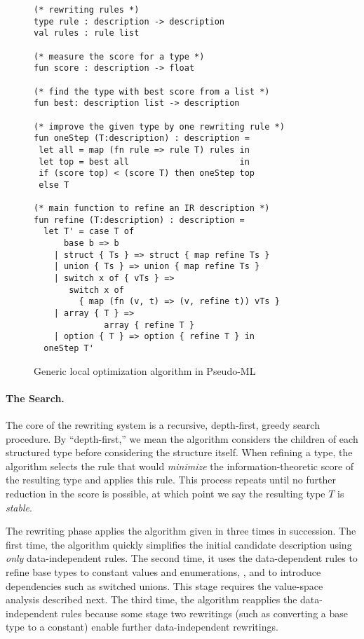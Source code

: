 \begin{figure}[bht]
{\small 
\begin{verbatim}
(* rewriting rules *)
type rule : description -> description  
val rules : rule list 

(* measure the score for a type *)
fun score : description -> float

(* find the type with best score from a list *)
fun best: description list -> description

(* improve the given type by one rewriting rule *)
fun oneStep (T:description) : description =
 let all = map (fn rule => rule T) rules in
 let top = best all                      in
 if (score top) < (score T) then oneStep top
 else T

(* main function to refine an IR description *) 
fun refine (T:description) : description =
  let T' = case T of
      base b => b
    | struct { Ts } => struct { map refine Ts }
    | union { Ts } => union { map refine Ts }
    | switch x of { vTs } => 
       switch x of 
         { map (fn (v, t) => (v, refine t)) vTs }
    | array { T } => 
              array { refine T }
    | option { T } => option { refine T } in
  oneStep T'
\end{verbatim}
}
\caption{Generic local optimization algorithm in Pseudo-ML} \shrink
\label{fig:refinement}
\end{figure}

\paragraph*{The Search.}
The core of the rewriting system is 
a recursive, depth-first, greedy search procedure. 
By ``depth-first,'' we mean the algorithm considers the 
children of each structured type before considering
the structure itself. When refining a type, the algorithm selects the rule that 
would {\em minimize} the information-theoretic score of the resulting
type and applies this rule.  This process repeats  until
no further reduction in the score is possible, at
which point we say the resulting type $T$ is {\em stable}.

The rewriting phase applies the
algorithm given in  three
times in succession. 
The first time, the algorithm quickly simplifies the initial candidate
description using {\em only} data-independent rules. The second time,
it uses the data-dependent 
rules to refine base types to constant values and enumerations, \etc{},
and to introduce dependencies such as switched unions. This stage
requires the value-space analysis described next.
The third time, the algorithm reapplies the data-independent rules
because some stage two rewritings (such as converting a base type to a
constant) enable further data-independent rewritings.

